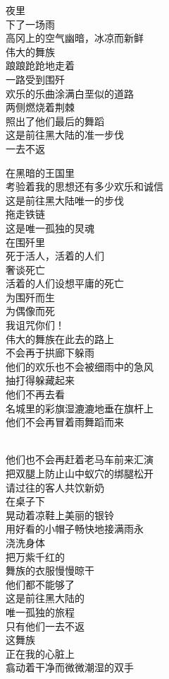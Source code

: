 \documentclass{article}
\begin{document}
夜里\\
下了一场雨
\\
高冈上的空气幽暗，冰凉而新鲜 \\ 


伟大的舞族\\
踉踉跄跄地走着\\
一路受到围歼\\
欢乐的乐曲涂满白垩似的道路\\
两侧燃烧着荆棘
\\
照出了他们最后的舞蹈 \\ 


这是前往黑大陆的准一步伐\\
一去不返\\
\newpage

在黑暗的王国里\\
考验着我的思想还有多少欢乐和诚信\\
这是前往黑大陆唯一的步伐\\
拖走铁链\\
这是唯一孤独的炅魂\\
在围歼里\\
死于活人，活着的人们\\
奢谈死亡\\
活着的人们设想平庸的死亡\\
为围歼而生
\\
为偶像而死 \\ 


我诅咒你们！ \\ 


伟大的舞族在此去的路上\\
不会再于拱廊下躲雨\\
他们的欢乐也不会被细雨中的急风\\
抽打得躲藏起来\\
他们不再去看\\
名城里的彩旗湿漉漉地垂在旗杆上\\
他们不会再冒着雨舞蹈而来
\newpage

\\
他们也不会再赶着老马车前来汇演 \\ 


把双腿上防止山中蚁穴的绑腿松开\\
请过往的客人共饮新奶\\
在桌子下\\
晃动着凉鞋上美丽的银铃\\
用好看的小帽子畅快地接满雨永\\
浇洗身体\\
把万紫千红的\\
舞族的衣服慢慢晾干
\\
他们都不能够了 \\ 


这是前往黑大陆的\\
唯一孤独的旅程\\
只有他们一去不返\\
这舞族\\
正在我的心脏上\\
翕动着干净而微微潮湿的双手
\end{document}
